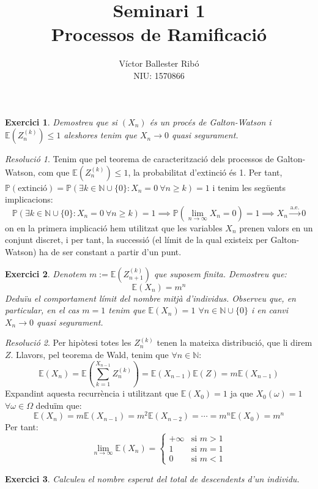 \documentclass[10pt,a4paper]{article}
\title{\bfseries\Large Seminari 1\\Processos de Ramificació}
\author{Víctor Ballester Ribó\\NIU: 1570866}
\date{\parbox{\linewidth}{\centering
  Processos estocàstics\endgraf
  Grau en Matemàtiques\endgraf
  Universitat Autònoma de Barcelona\endgraf
  Març de 2023}}
\newcommand{\NN}{\ensuremath{\mathbb{N}}} %
\newcommand{\Prob}{\ensuremath{\mathbb{P}}} %
\newcommand{\Exp}{\mathbb{E}} %
\newcommand{\almoste}[1]{\overset{\text{a.e.}}{#1}} %
\newtheorem{exercici}{Exercici}
\theoremstyle{definition}
\theoremstyle{remark}
\newtheorem*{res}{Resolució}
\begin{document}
\maketitle
\begin{exercici}
  Demostreu que si $(X_n)$ és un procés de Galton-Watson i $\Exp(Z_n^{(k)}) \leq 1$ aleshores tenim que $X_n \to 0$ quasi segurament.
\end{exercici}
\begin{res}
  Tenim que pel teorema de caracterització dels processos de Galton-Watson, com que $\Exp(Z_n^{(k)}) \leq 1$, la probabilitat d'extinció és 1. Per tant, $\Prob(\text{extinció})=\Prob\left(\exists k\in\NN\cup\{0\}:X_n=0\ \forall n\geq k\right)=1$ i tenim les següents implicacions:
  \begin{equation*}
    \Prob\left(\exists k\in\NN\cup\{0\}:X_n=0\ \forall n\geq k\right)=1 \implies\Prob\left(\lim_{n\to\infty}X_n=0\right)=1  \implies X_n\almoste{\longrightarrow}0
  \end{equation*}
  on en la primera implicació hem utilitzat que les variables $X_n$ prenen valors en un conjunt discret, i per tant, la successió (el límit de la qual existeix per Galton-Watson) ha de ser constant a partir d'un punt.
\end{res}
\begin{exercici}
  Denotem $m:=\Exp(Z_{n+1}^{(k)})$ que suposem finita. Demostreu que: $$\Exp(X_n)=m^n$$
  Deduïu el comportament límit del nombre mitjà d'individus. Observeu que, en particular, en el cas $m=1$ tenim que $\Exp(X_n)=1$ $\forall n\in\NN\cup\{0\}$ i en canvi $X_n\to 0$ quasi segurament.
\end{exercici}
\begin{res}
  Per hipòtesi totes les $Z_n^{(k)}$ tenen la mateixa distribució, que li direm $Z$. Llavors, pel teorema de Wald, tenim que $\forall n\in\NN$:
  $$\Exp(X_n)=\Exp\left(\sum_{k=1}^{X_{n-1}}Z_n^{(k)}\right)=\Exp(X_{n-1})\Exp(Z)=m\Exp(X_{n-1})$$
  Expandint aquesta recurrència i utilitzant que $\Exp(X_0)=1$ ja que $X_0(\omega)=1$ $\forall\omega\in\Omega$ deduïm que:
  $$\Exp(X_n)=m\Exp(X_{n-1})=m^2\Exp(X_{n-2})=\cdots=m^n\Exp(X_0)=m^n$$
  Per tant:
  $$\lim_{n\to\infty}\Exp(X_n)=\begin{cases}
      +\infty & \text{si $m>1$} \\
      1       & \text{si $m=1$} \\
      0       & \text{si $m<1$}
    \end{cases}$$
\end{res}
\begin{exercici}
  Calculeu el nombre esperat del total de descendents d'un individu.
\end{exercici}
\end{document}
